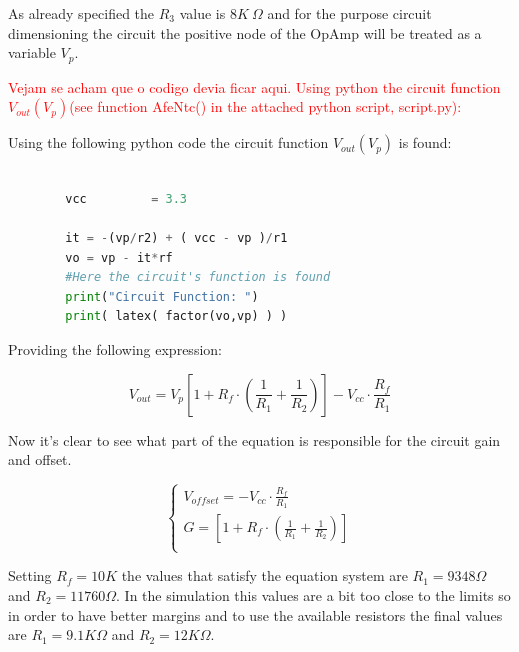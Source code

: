 \documentclass[12pt]{article}
\begin{document}
    As already specified the $R_3$ value is $8K~\Omega$ and for the purpose circuit dimensioning the circuit 
    the positive node of the OpAmp will be treated as a variable $V_p$.

    \textcolor{red}{ Vejam se acham que o codigo devia ficar aqui.       Using python the circuit function $V_{out}(V_p)$(see function AfeNtc() in the attached python script, script.py): }

    Using the following python code the circuit function $V_{out}(V_p)$ is found:
       
    \begin{lstlisting}[language=Python]
        
        vcc         = 3.3
    
        it = -(vp/r2) + ( vcc - vp )/r1
        vo = vp - it*rf
        #Here the circuit's function is found
        print("Circuit Function: ")
        print( latex( factor(vo,vp) ) )

    \end{lstlisting}
    
    Providing the following expression:

    \begin{equation}
        V_{out} = V_p\left[ 1 + R_f\cdot\left(\frac{1}{R_1} + \frac{1}{R_2}\right) \right] - V_{cc}\cdot\frac{R_f}{R_1}
    \end{equation}

    Now it's clear to see what part of the equation is responsible for the circuit gain and offset.
    
    \begin{equation}
        \begin{cases}
            V_{offset} = - V_{cc}\cdot\frac{R_f}{R_1}\\
            G = \left[ 1 + R_f\cdot\left(\frac{1}{R_1} + \frac{1}{R_2}\right) \right]\\
        \end{cases}
    \end{equation}

    Setting $R_f = 10K$ the values that satisfy the equation system are $R_1 = 9348 \Omega$ and $R_2 = 11760 \Omega$.
    In the simulation this values are a bit too close to the limits so in order to have better margins and to use the available resistors
    the final values are  $R_1 = 9.1K \Omega$ and $R_2 = 12K \Omega$.
\end{document}
